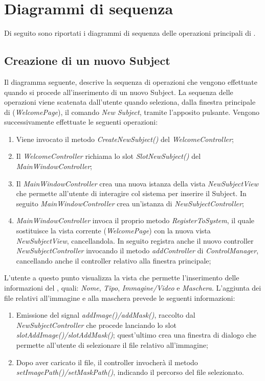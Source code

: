 \section{Diagrammi di sequenza}
\label{diagrammi_seq}

Di seguito sono riportati i diagrammi di sequenza delle operazioni principali di \project{}.

\subsection{Creazione di un nuovo Subject}
\label{creazione_subject}
Il diagramma seguente, descrive la sequenza di operazioni che vengono effettuate quando si procede all'inserimento di un nuovo Subject\g{}. La sequenza delle operazioni viene scatenata dall'utente quando seleziona, dalla finestra principale di \project{} (\textit{WelcomePage}), il comando \textit{New Subject}, tramite l'apposito pulsante. Vengono successivamente effettuate le seguenti operazioni:
\begin{enumerate}
	\item Viene invocato il metodo \textit{CreateNewSubject()} del \textit{WelcomeController};
	\item Il \textit{WelcomeController} richiama lo slot \textit{SlotNewSubject()} del \textit{MainWindowController};
	\item Il \textit{MainWindowController} crea una nuova istanza della vista \textit{NewSubjectView} che permette all'utente di interagire col sistema per inserire il Subject\g{}. In seguito \textit{MainWindowController} crea un'istanza di \textit{NewSubjectController};
	\item \textit{MainWindowController} invoca il proprio metodo \textit{RegisterToSystem}, il quale sostituisce la vista corrente (\textit{WelcomePage}) con la nuova vista \textit{NewSubjectView}, cancellandola. In seguito registra anche il nuovo controller \textit{NewSubjectController} invocando il metodo \textit{addController} di \textit{ControlManager}, cancellando anche il controller relativo alla finestra principale;
\end{enumerate}
L'utente a questo punto visualizza la vista che permette l'inserimento delle informazioni del \Subject{}, quali: \textit{Nome}, \textit{Tipo}, \textit{Immagine/Video} e \textit{Maschera}. L'aggiunta dei file relativi all'immagine e alla maschera prevede le seguenti informazioni:
\begin{enumerate}
	\item Emissione del signal\g{} \textit{addImage()/addMask()}, raccolto dal \textit{NewSubjectController} che procede lanciando lo slot \textit{slotAddImage()/slotAddMask()}; quest'ultimo crea una finestra di dialogo che permette all'utente di selezionare il file relativo all'immagine;
	\item Dopo aver caricato il file, il controller invocherà il metodo \textit{setImagePath()/setMaskPath()}, indicando il percorso del file selezionato.
\end{enumerate}
